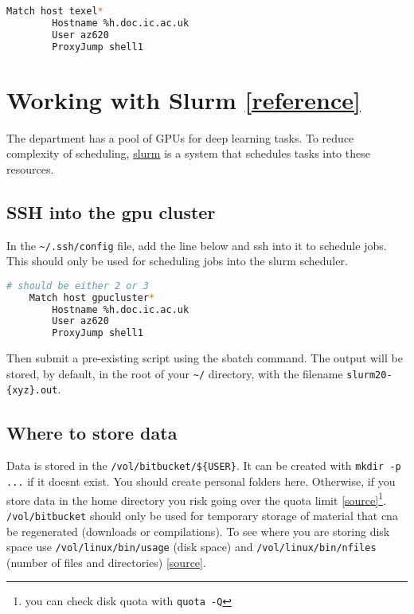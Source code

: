 \documentclass[11pt]{article}
\begin{document}
\begin{lstlisting}[language=bash]
    Match host texel*
        Hostname %h.doc.ic.ac.uk
        User az620
        ProxyJump shell1
\end{lstlisting}

\section*{Working with Slurm \href{https://www.imperial.ac.uk/computing/people/csg/guides/hpcomputing/gpucluster/}{[reference]}}

The department has a pool of GPUs for deep learning tasks. To reduce complexity of scheduling, \href{https://slurm.schedmd.com/}{slurm} is a system that schedules tasks into these resources.

\subsection*{SSH into the gpu cluster}

In the \verb|~/.ssh/config| file, add the line below and ssh into it to schedule jobs. This should only be used for scheduling jobs into the slurm scheduler.

\begin{lstlisting}[language=bash]
    # should be either 2 or 3
    Match host gpucluster*
        Hostname %h.doc.ic.ac.uk
        User az620
        ProxyJump shell1
\end{lstlisting}

Then submit a pre-existing script using the sbatch command. The output will be stored, by default, in the root of your \verb|~/| directory, with the filename \verb|slurm20-{xyz}.out|.

\subsection*{Where to store data}

Data is stored in the \verb|/vol/bitbucket/${USER}|. It can be created with \verb|mkdir -p ...| if it doesnt exist. You should create personal folders here. Otherwise, if you store data in the home directory you risk going over the quota limit \href{https://www.imperial.ac.uk/computing/people/csg/guides/python/virtual-environment/#d.en.1235829}{[source]}\footnote{you can check disk quota with \texttt{quota -Q}}. \texttt{/vol/bitbucket} should only be used for temporary storage of material that cna be regenerated (downloads or compilations). To see where you are storing disk space use \texttt{/vol/linux/bin/usage} (disk space) and \texttt{/vol/linux/bin/nfiles} (number of files and directories) \href{https://www.imperial.ac.uk/computing/people/csg/guides/python/virtual-environment/#d.en.1235829}{[source]}.
\end{document}
